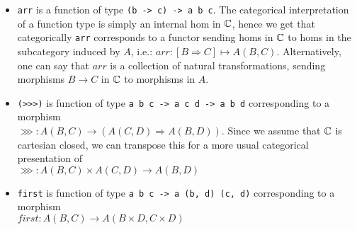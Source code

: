 \begin{itemize}
    \item \verb|arr| is a function of type \verb|(b -> c) -> a b c|.
        The categorical interpretation of a function type is simply an internal
        hom in $\mathbb{C}$, hence we get that categorically \verb|arr| corresponds
        to a functor sending homs in $\mathbb{C}$ to homs in the subcategory induced
        by $A$, i.e.: $arr: [B \Rightarrow C] \mapsto A(B, C)$. Alternatively, one
        can say that $arr$ is a collection of natural transformations, sending
        morphisms $B \to C$ in $\mathbb{C}$ to morphisms in $A$.
    \item \verb|(>>>)| is function of type \verb|a b c -> a c d -> a b d|
        corresponding to a morphism\\
        $\ggg: A(B, C) \to (A(C, D) \Rightarrow A(B, D))$.
        Since we assume that $\mathbb{C}$ is cartesian closed, we can transpose this
        for a more usual categorical presentation of\\
        $\ggg: A(B, C) \times A(C, D) \to A(B, D)$
    \item \verb|first| is function of type
        \verb|a b c -> a (b, d) (c, d)|
        corresponding to a morphism\\
        $first: A(B, C) \to A(B \times D,C \times D)$
\end{itemize}
